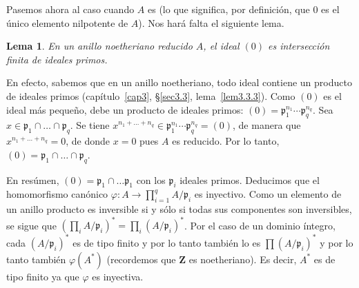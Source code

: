 \documentclass[bibtotoc,leqno,spanish]{amsbook}
\let\emph\relax %
\newcommand{\ZZ}{\mathbf{Z}}
\newcommand{\idl}[1]{\mathfrak{#1}}
\renewcommand{\to}[1][]{\xrightarrow{#1}}
\numberwithin{equation}{section}
\theoremstyle{note}
\theoremstyle{note}
\newtheorem*{lemma*}{Lema}
\theoremstyle{rem}
\numberwithin{theorem}{section}
\numberwithin{proposition}{section}
\numberwithin{definition}{section}
\numberwithin{lemma}{section}
\numberwithin{corollary}{section}
\numberwithin{example}{section}
\numberwithin{footnote}{section}%
\begin{document}
Pasemos ahora al caso cuando $A$ es \emph{reducido} (lo que significa, por definici\'on, que $0$ es el
\'unico elemento nilpotente de $A$). Nos har\'a falta el siguiente lema.

\begin{lemma*}
En un anillo noetheriano reducido $A$, el ideal $(0)$ es intersecci\'on finita de ideales primos.
\end{lemma*}

En efecto, sabemos que en un anillo noetheriano, todo ideal contiene un producto de ideales primos
(cap\'itulo~\ref{cap3}, \S\ref{sec3.3}, lema~\ref{lem3.3.3}).
Como $(0)$ es el ideal m\'as peque\~no, debe \emph{ser} un producto de ideales primos:
$(0) = \idl{p}_{1}^{n_{1}}\cdots\idl{p}_{q}^{n_{q}}$. Sea $x\in\idl{p}_{1}\cap\dots\cap\idl{p}_{q}$. Se
tiene $x^{n_{1}+\dots+n_{q}}\in\idl{p}_{1}^{n_{1}}\cdots\idl{p}_{q}^{n_{q}} = (0)$, de manera que
$x^{n_{1}+\dots+n_{q}}=0$, de donde $x = 0$ pues $A$ es reducido. Por lo tanto, $(0) = \idl{p}_{1}\cap\dots\cap\idl{p}_{q}$.

En res\'umen, $(0) = \idl{p}_{1}\cap\dots\idl{p}_{1}$ con los $\idl{p}_{i}$ ideales primos. Deducimos que
el homomorfismo can\'onico $\varphi:A\to\prod_{i=1}^{q}A/\idl{p}_{i}$ es inyectivo. Como un elemento de un anillo
producto es inversible si y s\'olo si todas sus componentes son inversibles, se sigue que
$\left(\prod_{i}A/\idl{p}_{i}\right)^{*}=\prod_{i}(A/\idl{p}_{i})^{*}$. Por el caso de un dominio \'integro, cada
$(A/\idl{p}_{i})^{*}$ es de tipo finito y por lo tanto tambi\'en lo es $\prod(A/\idl{p}_{i})^{*}$ y por lo tanto
tambi\'en $\varphi(A^{*})$ (recordemos que $\ZZ$ es noetheriano). Es decir, $A^{*}$ es de tipo finito ya que
$\varphi$ es inyectiva.
\end{document}

